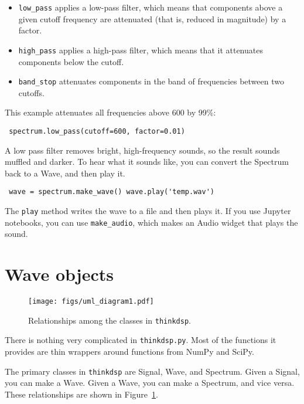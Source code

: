 \documentclass[12pt]{book} \usepackage[width=5.5in,height=8.5in, hmarginratio=3:2,vmarginratio=1:1]{geometry}
\begin{document}
\begin{itemize} 

\item \verb"low_pass" applies a low-pass filter, which means that components above a given cutoff frequency are attenuated (that is, reduced in magnitude) by a factor. 

\item \verb"high_pass" applies a high-pass filter, which means that it attenuates components below the cutoff. 

\item \verb"band_stop" attenuates components in the band of frequencies between two cutoffs. 

\end{itemize} 

This example attenuates all frequencies above 600 by 99\%: 

\begin{verbatim} spectrum.low_pass(cutoff=600, factor=0.01) \end{verbatim} 

A low pass filter removes bright, high-frequency sounds, so the result sounds muffled and darker. To hear what it sounds like, you can convert the Spectrum back to a Wave, and then play it. 

\begin{verbatim} wave = spectrum.make_wave() wave.play('temp.wav') \end{verbatim} 

The {\tt play} method writes the wave to a file and then plays it. If you use Jupyter notebooks, you can use \verb"make_audio", which makes an Audio widget that plays the sound. 

\section{Wave objects} 

\begin{figure} 

\centerline{\texttt{[image: figs/uml\_diagram1.pdf]}} \caption{Relationships among the classes in {\tt thinkdsp}.} \label{fig.diagram1} \end{figure} 

There is nothing very complicated in {\tt thinkdsp.py}. Most of the functions it provides are thin wrappers around functions from NumPy and SciPy. 

The primary classes in {\tt thinkdsp} are Signal, Wave, and Spectrum. Given a Signal, you can make a Wave. Given a Wave, you can make a Spectrum, and vice versa. These relationships are shown in Figure~\ref{fig.diagram1}. 
\end{document}
